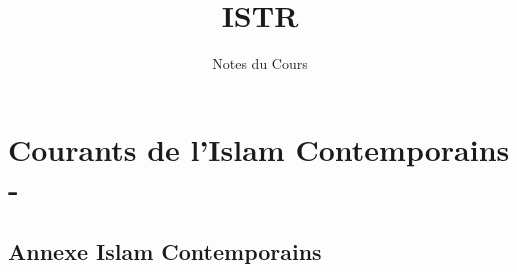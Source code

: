 \documentclass[oneside,10pt]{book} %
\title{ISTR}
\author{Notes du Cours}
\begin{document}


\maketitle



\setcounter{page}{1}
\begin{fullwidth}
\tableofcontents
\end{fullwidth}

\setcounter{page}{1}
 
\mainmatter



\part{Courants de l'Islam Contemporains - }

%







\chapter{Annexe Islam Contemporains}



\backmatter
%
%
\printbibliography

\listoftheorems[ignoreall,show={Def}]
%
\end{document}
